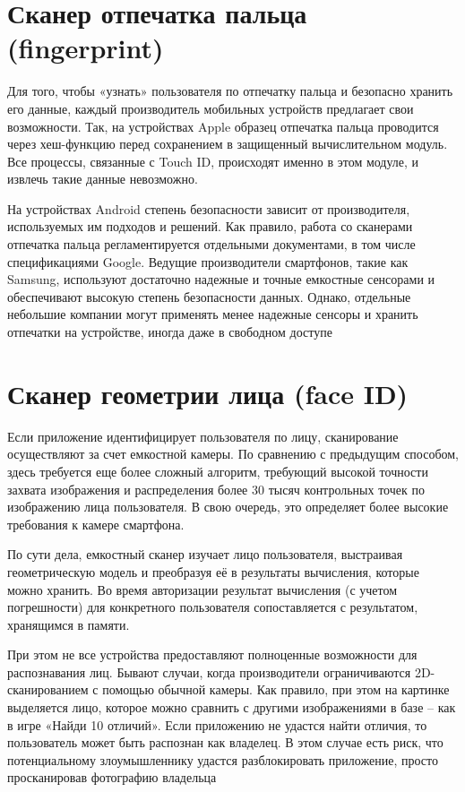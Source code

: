 \documentclass[a4paper,12pt]{extreport}
\begin{document}
\section{Сканер отпечатка пальца (fingerprint)}
Для того, чтобы «узнать» пользователя по отпечатку пальца и безопасно хранить его данные, каждый производитель мобильных устройств предлагает свои возможности. Так, на устройствах Apple образец отпечатка пальца проводится через хеш-функцию перед сохранением в защищенный вычислительном модуль. Все процессы, связанные с Touch ID, происходят именно в этом модуле, и извлечь такие данные невозможно.

На устройствах Android степень безопасности зависит от производителя, используемых им подходов и решений. Как правило, работа со сканерами отпечатка пальца регламентируется отдельными документами, в том числе спецификациями Google. Ведущие производители смартфонов, такие как Samsung, используют достаточно надежные и точные емкостные сенсорами и обеспечивают высокую степень безопасности данных. Однако, отдельные небольшие компании могут применять менее надежные сенсоры и хранить отпечатки на устройстве, иногда даже в свободном доступе

\section{Сканер геометрии лица (face ID)}
Если приложение идентифицирует пользователя по лицу, сканирование осуществляют за счет емкостной камеры. По сравнению с предыдущим способом, здесь требуется еще более сложный алгоритм, требующий высокой точности захвата изображения и распределения более 30 тысяч контрольных точек по изображению лица пользователя. В свою очередь, это определяет более высокие требования к камере смартфона.

По сути дела, емкостный сканер изучает лицо пользователя, выстраивая геометрическую модель и преобразуя её в результаты вычисления, которые можно хранить. Во время авторизации результат вычисления (с учетом погрешности) для конкретного пользователя сопоставляется с результатом, хранящимся в памяти.

При этом не все устройства предоставляют полноценные возможности для распознавания лиц. Бывают случаи, когда производители ограничиваются 2D-сканированием с помощью обычной камеры. Как правило, при этом на картинке выделяется лицо, которое можно сравнить с другими изображениями в базе – как в игре «Найди 10 отличий». Если приложению не удастся найти отличия, то пользователь может быть распознан как владелец. В этом случае есть риск, что потенциальному злоумышленнику удастся разблокировать приложение, просто просканировав фотографию владельца
\end{document}
